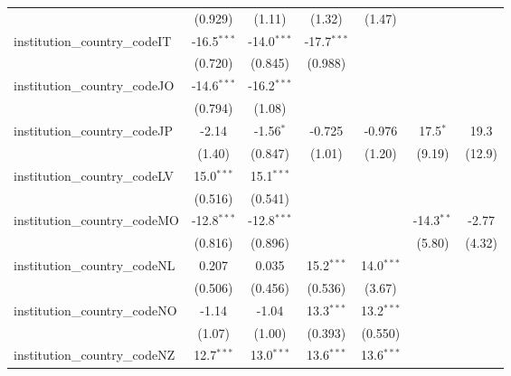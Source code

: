 \begin{tabular}{lcccccc}
                                         & (0.929)       & (1.11)        & (1.32)        & (1.47)        &               &   \\   
   institution\_country\_codeIT          & -16.5$^{***}$ & -14.0$^{***}$ & -17.7$^{***}$ &               &               &   \\   
                                         & (0.720)       & (0.845)       & (0.988)       &               &               &   \\   
   institution\_country\_codeJO          & -14.6$^{***}$ & -16.2$^{***}$ &               &               &               &   \\   
                                         & (0.794)       & (1.08)        &               &               &               &   \\   
   institution\_country\_codeJP          & -2.14         & -1.56$^{*}$   & -0.725        & -0.976        & 17.5$^{*}$    & 19.3\\   
                                         & (1.40)        & (0.847)       & (1.01)        & (1.20)        & (9.19)        & (12.9)\\   
   institution\_country\_codeLV          & 15.0$^{***}$  & 15.1$^{***}$  &               &               &               &   \\   
                                         & (0.516)       & (0.541)       &               &               &               &   \\   
   institution\_country\_codeMO          & -12.8$^{***}$ & -12.8$^{***}$ &               &               & -14.3$^{**}$  & -2.77\\   
                                         & (0.816)       & (0.896)       &               &               & (5.80)        & (4.32)\\   
   institution\_country\_codeNL          & 0.207         & 0.035         & 15.2$^{***}$  & 14.0$^{***}$  &               &   \\   
                                         & (0.506)       & (0.456)       & (0.536)       & (3.67)        &               &   \\   
   institution\_country\_codeNO          & -1.14         & -1.04         & 13.3$^{***}$  & 13.2$^{***}$  &               &   \\   
                                         & (1.07)        & (1.00)        & (0.393)       & (0.550)       &               &   \\   
   institution\_country\_codeNZ          & 12.7$^{***}$  & 13.0$^{***}$  & 13.6$^{***}$  & 13.6$^{***}$  &               &   \\   

\end{tabular}

